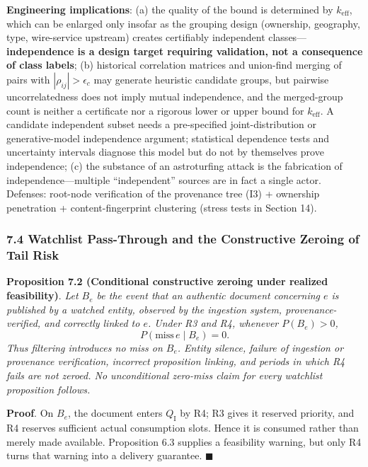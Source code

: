 \documentclass[
  11pt]{article}
\begin{document}
\textbf{Engineering implications}: (a) the quality of the bound is
determined by \(k_{\mathrm{eff}}\), which can be enlarged only insofar
as the grouping design (ownership, geography, type, wire-service
upstream) creates certifiably independent classes---\textbf{independence
is a design target requiring validation, not a consequence of class
labels}; (b) historical correlation matrices and union-find merging of
pairs with \(|\rho_{ij}|>\epsilon_c\) may generate heuristic candidate
groups, but pairwise uncorrelatedness does not imply mutual
independence, and the merged-group count is neither a certificate nor a
rigorous lower or upper bound for \(k_{\mathrm{eff}}\). A candidate
independent subset needs a pre-specified joint-distribution or
generative-model independence argument; statistical dependence tests and
uncertainty intervals diagnose this model but do not by themselves prove
independence; (c) the substance of an astroturfing attack is the
fabrication of independence---multiple ``independent'' sources are in
fact a single actor. Defenses: root-node verification of the provenance
tree (I3) + ownership penetration + content-fingerprint clustering
(stress tests in Section 14).

\subsubsection{7.4 Watchlist Pass-Through and the Constructive Zeroing
of Tail
Risk}\label{watchlist-pass-through-and-the-constructive-zeroing-of-tail-risk}

\textbf{Proposition 7.2 (Conditional constructive zeroing under realized
feasibility)}. \emph{Let \(B_e\) be the event that an authentic document
concerning \(e\) is published by a watched entity, observed by the
ingestion system, provenance-verified, and correctly linked to \(e\).
Under R3 and R4, whenever \(P(B_e)>0\),}
\[P(\mathrm{miss}\,e\mid B_e)=0.\] \emph{Thus filtering introduces no
miss on \(B_e\). Entity silence, failure of ingestion or provenance
verification, incorrect proposition linking, and periods in which R4
fails are not zeroed. No unconditional zero-miss claim for every
watchlist proposition follows.}

\textbf{Proof}. On \(B_e\), the document enters \(Q_{\mathrm I}\) by R4;
R3 gives it reserved priority, and R4 reserves sufficient actual
consumption slots. Hence it is consumed rather than merely made
available. Proposition 6.3 supplies a feasibility warning, but only R4
turns that warning into a delivery guarantee. \(\blacksquare\)
\end{document}

